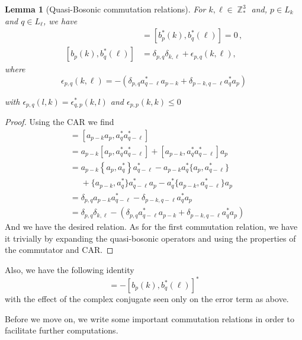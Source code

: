 \documentclass[sn-mathphys, Numbered ,a4paper]{sn-jnl}%
\DeclareMathOperator{\Z}{\mathbb{Z}}
\theoremstyle{plain}
\newtheorem{lemma}[theorem]{Lemma}
\theoremstyle{definition}
\theoremstyle{remark}
\theoremstyle{plain}
\theoremstyle{definition}
\theoremstyle{remark}
\begin{document}
\begin{lemma}[Quasi-Bosonic commutation relations]\label{lem:paircomm}
For $k,\ell \in \Z^3_*$ and, $p \in L_{k}$ and $q\in L_{\ell}$, we have
   \begin{align}
       [b_{p}(k),b_{q}(\ell)] &= [b^*_{p}(k),b^*_{q}(\ell)] = 0\,,\\
       [b_{p}(k),b^*_{q}(\ell)] &= \delta_{p,q}\delta_{k,\ell} + \epsilon_{p,q}(k,\ell),
   \end{align} where
   \begin{equation}
       \epsilon_{p,q}(k,\ell) = -\left(\delta_{p,q}a^*_{q-\ell}a_{p-k} + \delta_{p-k,q-\ell}a^*_{q}a_{p}\right)
   \end{equation}

   
   with $\epsilon_{p,q}(l,k) = \epsilon^*_{q,p}(k,l) $ and $\epsilon_{p,p}(k,k)\leq 0$ \end{lemma}
\begin{proof} Using the CAR we find
    \begin{align}
        [b_{p}(k),b^*_{q}(\ell)] &= [a_{p-k}a_{p},a^*_{q}a^*_{q-\ell}]\nonumber\\
        &= a_{p-k}[a_p,a^*_{q}a^*_{q-\ell}] + [a_{p-k},a^*_{q}a^*_{q-\ell}]a_{p}\nonumber\\
        &= a_{p-k}\left\{a_p,a^*_{q}\right\}a^*_{q-\ell} - a_{p-k}a^*_{q}\{a_{p},a^*_{q-\ell}\}\nonumber \\ &\phantom{=}+ \{a_{p-k},a^*_q\}a^*_{q-\ell}a_{p} - a^*_{q}\{a_{p-k},a^*_{q-\ell}\}a_{p}\nonumber\\
        &=\delta_{p,q}a_{p-k}a^*_{q-\ell} - \delta_{p-k,q-\ell}a^*_{q}a_{p}\nonumber\\
        &= \delta_{p,q} \delta_{k,\ell} - \left( \delta_{p,q} a^*_{q-\ell} a_{p-k} + \delta_{p-k,q-\ell} a^*_{q} a_{p} \right)
    \end{align}
And we have the desired relation. As for the first commutation relation, we have it trivially by expanding the quasi-bosonic operators and using the properties of the commutator and CAR.
\end{proof}
Also, we have the following identity
\begin{equation}
    [b^*_p(k), b_q(\ell)] = -[b_{p}(k),b^*_{q}(\ell)]^*
\end{equation}
with the effect of the complex conjugate seen only on the error term as above.  

Before we move on, we write some important commutation relations in order to facilitate further computations.\newline
\end{document}
